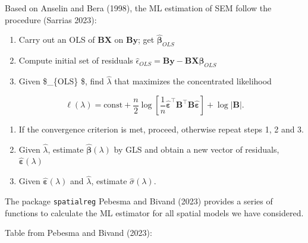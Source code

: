 \documentclass[
  letterpaper,
  DIV=11,
  numbers=noendperiod]{scrreprt}
\begin{document}
Based on Anselin and Bera (1998), the ML estimation of SEM follow the
procedure (Sarrias 2023):

\begin{enumerate}
\def\labelenumi{\arabic{enumi})}
\item
  Carry out an OLS of \(\boldsymbol{\mathbf{B}}\boldsymbol{\mathbf{X}}\)
  on \(\boldsymbol{\mathbf{B}}\boldsymbol{\mathbf{y}}\); get
  \(\widehat{\boldsymbol{\mathbf{\beta}}}_{OLS}\)
\item
  Compute initial set of residuals
  \(\widehat{\epsilon}_{OLS} = \boldsymbol{\mathbf{B}}\boldsymbol{\mathbf{y}} - \boldsymbol{\mathbf{B}}\boldsymbol{\mathbf{X}}\widehat{\boldsymbol{\mathbf{\beta}}}_{OLS}\)
\item
  Given \$\widehat{\epsilon}\_\{OLS\} \$, find \(\widehat{\lambda}\)
  that maximizes the concentrated likelihood
\end{enumerate}

\[
\ell(\lambda)= \mbox{const} + \frac{n}{2}\log\left[\frac{1}{n}\widehat{\boldsymbol{\mathbf{\varepsilon}}}^\top\boldsymbol{\mathbf{B}}^\top\boldsymbol{\mathbf{B}} \widehat{\boldsymbol{\mathbf{\varepsilon}}}\right] + \log\left|\boldsymbol{\mathbf{B}}\right|.
\]

\begin{enumerate}
\def\labelenumi{\arabic{enumi})}
\setcounter{enumi}{3}
\item
  If the convergence criterion is met, proceed, otherwise repeat steps
  1, 2 and 3.
\item
  Given \(\widehat{\lambda}\), estimate
  \(\widehat{\boldsymbol{\mathbf{\beta}}}(\lambda)\) by GLS and obtain a
  new vector of residuals,
  \(\widehat{\boldsymbol{\mathbf{\varepsilon}}}(\lambda)\)
\item
  Given \(\widehat{\boldsymbol{\mathbf{\varepsilon}}}(\lambda)\) and
  \(\widehat{\lambda}\), estimate \(\widehat{\sigma}(\lambda)\).
\end{enumerate}

The package \texttt{spatialreg} Pebesma and Bivand (2023) provides a
series of functions to calculate the ML estimator for all spatial models
we have considered.

Table from Pebesma and Bivand (2023):
\end{document}
